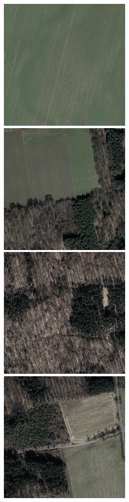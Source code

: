 \begin{figure}
    \centering

    \includegraphics[width=\VegetationIndicesImageWidth]{images/vegetation/original/1} \hfill
    \includegraphics[width=\VegetationIndicesImageWidth]{images/vegetation/original/2} \hfill
    \includegraphics[width=\VegetationIndicesImageWidth]{images/vegetation/original/3} \hfill
    \includegraphics[width=\VegetationIndicesImageWidth]{images/vegetation/original/4} \hfill

\end{figure}
